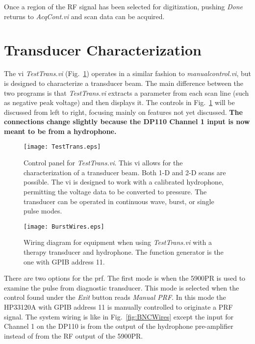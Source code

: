 \documentclass[10pt]{article}
\begin{document}
Once a region of the RF signal has been selected for digitization,
pushing {\it Done} returns to {\it AcqCont.vi} and scan data can
be acquired.

\section{Transducer Characterization}

The vi {\it TestTrans.vi} (Fig.~\ref{fig:TestTrans}) operates in a
similar fashion to {\it manualcontrol.vi}, but is designed to
characterize a transducer beam. The main difference between the
two programs is that {\it TestTrans.vi} extracts a parameter from
each scan line (such as negative peak voltage) and then displays
it. The controls in Fig.~\ref{fig:TestTrans} will be discussed
from left to right, focusing mainly on features not yet discussed.
{\bf The connections change slightly because the DP110 Channel 1
input is now meant to be from a hydrophone.}

\begin{figure}[!htb]
\begin{center}
\texttt{[image: TestTrans.eps]}
 \caption{Control panel for {\it TestTrans.vi}. This vi allows for the
 characterization of a transducer beam. Both 1-D and 2-D scans are possible.
 The vi is designed to work with a calibrated hydrophone, permitting the voltage
 data to be converted to pressure. The transducer can be operated in continuous
 wave, burst, or single pulse modes.}
 \label{fig:TestTrans}
\end{center}
\end{figure}
\begin{figure}[!htb]
\begin{center}
\texttt{[image: BurstWires.eps]}
 \caption{Wiring diagram for equipment when using {\it TestTrans.vi}
 with a therapy transducer and hydrophone. The function generator is the one
 with GPIB address 11.}
 \label{fig:BurstWires}
\end{center}
\end{figure}

There are two options for the prf. The first mode is when the
5900PR is used to examine the pulse from diagnostic transducer.
This mode is selected when the control found under the {\it Exit}
button reads {\it Manual PRF}. In this mode the HP33120A with GPIB
address 11 is manually controlled to originate a PRF signal. The
system wiring is like in Fig.~\ref{fig:BNCWires} except the input
for Channel 1 on the DP110 is from the output of the hydrophone
pre-amplifier instead of from the RF output of the 5900PR.
\end{document}
